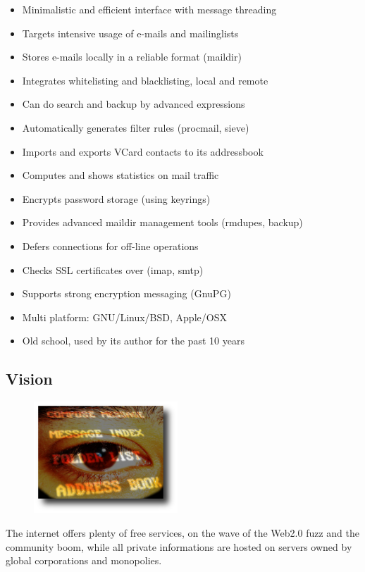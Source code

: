 \documentclass[a4,onecolumn,portrait]{article}
\begin{document}
\footnotesize
\begin{itemize}
\item Minimalistic and efficient interface with message threading
\item Targets intensive usage of e-mails and mailinglists
\item Stores e-mails locally in a reliable format (maildir)
\item Integrates whitelisting and blacklisting, local and remote
\item Can do search and backup by advanced expressions
\item Automatically generates filter rules (procmail, sieve)
\item Imports and exports VCard contacts to its addressbook
\item Computes and shows statistics on mail traffic
\item Encrypts password storage (using keyrings)
\item Provides advanced maildir management tools (rmdupes, backup)
\item Defers connections for off-line operations
\item Checks SSL certificates over (imap, smtp)
\item Supports strong encryption messaging (GnuPG)
\item Multi platform: GNU/Linux/BSD, Apple/OSX
\item Old school, used by its author for the past 10 years
\end{itemize}
\normalsize
\subsection{Vision}
\label{sec-1-2}

\begin{figure}
  \begin{center}
    \includegraphics[width=0.48\textwidth]{foster_privacy.png}
  \end{center}
\end{figure}
The internet offers plenty of free services, on the wave of the Web2.0
fuzz and the community boom, while all private informations are hosted
on servers owned by global corporations and monopolies.
\end{document}
